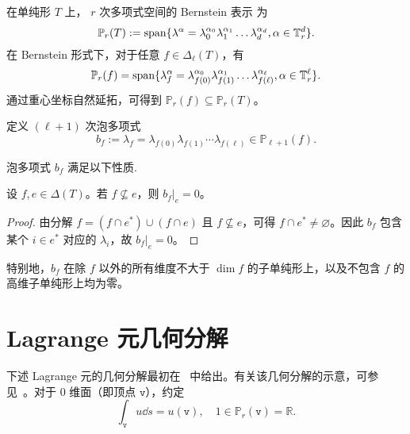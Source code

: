 在单纯形 $T$ 上， $r$ 次多项式空间的 Bernstein 表示 为
\[
\mathbb P_r(T) :={\rm span}\{ \lambda^{\alpha} = \lambda_{0}^{\alpha_0}\lambda_{1}^{\alpha_1}\ldots \lambda_{d}^{\alpha_d}, \alpha\in \mathbb T_r^{d}\}.
\]
在 Bernstein 形式下，对于任意 $f \in \Delta_\ell(T)$，有
\[
\mathbb P_r(f) ={\rm span}\{ \lambda_{f}^{\alpha} = \lambda_{f(0)}^{\alpha_0}\lambda_{f(1)}^{\alpha_1}\ldots \lambda_{f(\ell)}^{\alpha_{\ell}},  \alpha \in \mathbb T_r^{\ell}\}.
\]
通过重心坐标自然延拓，可得到 $\mathbb{P}_r(f) \subseteq \mathbb{P}_r(T)$。

定义 $(\ell+1)$ 次泡多项式
\[
b_f := \lambda_f = \lambda_{f(0)} \lambda_{f(1)} \cdots \lambda_{f(\ell)} \in \mathbb{P}_{\ell+1}(f).
\]

泡多项式 $b_f$ 满足以下性质.

\begin{lemma}\label{lm:bf}
设 $f,e \in \Delta(T)$。若 $f \not\subseteq e$，则 $b_f|_e = 0$。
\end{lemma}

\begin{proof}
由分解 $f = (f \cap e^*) \cup (f \cap e)$ 且 $f \not\subseteq e$，可得 $f \cap e^* \neq \varnothing$。因此 $b_f$ 包含某个 $i \in e^*$ 对应的 $\lambda_i$，故 $b_f|_e = 0$。
\end{proof}

特别地，$b_f$ 在除 $f$ 以外的所有维度不大于 $\dim f$ 的子单纯形上，以及不包含 $f$ 的高维子单纯形上均为零。




\section{Lagrange 元几何分解}\label{sec:geodecompLagrange}
下述 Lagrange 元的几何分解最初在~\cite[(2.6)]{ArnoldFalkWinther2009} 中给出。有关该几何分解的示意，可参见~\cite[Fig. 2.1]{ArnoldFalkWinther2009}。对于 $0$ 维面（即顶点 $\texttt{v}$），约定
$$
\int_{\texttt{v}} u \dd s = u(\texttt{v}), \quad 1\in \mathbb P_r(\texttt{v})=\mathbb R.
$$

